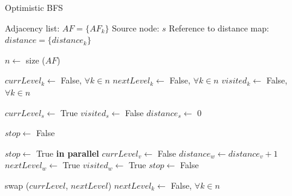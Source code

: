 \documentclass[letterpaper]{article}
\begin{document}
			\begin{algorithm}
				\caption{Optimistic BFS}
				\label{alg:optbfs}
				\begin{algorithmic}[1]
					\Require
						\Statex Adjacency list: $AF = \lbrace AF_k \rbrace$
						\Statex Source node: $s$
						\Statex Reference to distance map: $distance = \lbrace distance_k \rbrace$
					\Statex

					\State $n \gets$ size ($AF$) 					
					
					\State $currLevel_k \gets$ False, $\forall k \in n$
					\State $nextLevel_k \gets$ False, $\forall k \in n$
					\State $visited_k \gets$ False, $\forall k \in n$
					\Statex
					
					\State $currLevel_s \gets$ True
					\State $visited_s \gets$ False
					\State $distance_s \gets$ 0
					\Statex
					
					\State $stop \gets$ False
					\Statex
					
						\State $stop\gets$ True
						 \textbf{in parallel}
								\State $currLevel_v \gets$ False
										\State $distance_w \gets distance_v + 1$
										\State $nextLevel_w \gets$ True
										\State $visited_w \gets$ True
										\State $stop \gets$ False
									\EndIf
								\EndFor
							\EndIf
						\EndFor
						
						\vspace{-0.051cm} %
						
						\State swap ($currLevel$, $nextLevel$)
						\State $nextLevel_k \gets$ False, $\forall k\in n$
					\EndWhile
				\end{algorithmic}
			\end{algorithm}



						
			
\end{document}
